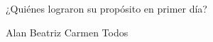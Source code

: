 ¿Quiénes lograron su prop\'osito en primer d\'ia?

\begin{oneparchoices}
    \choice Alan
    \CorrectChoice Beatriz
    \choice Carmen
    \choice Todos
\end{oneparchoices}